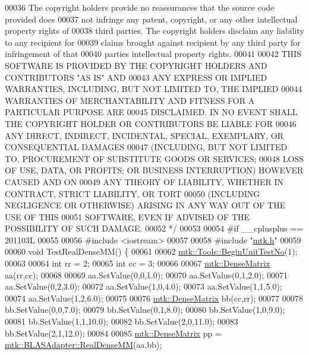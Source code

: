 \begin{DoxyCode}
00036 \textcolor{comment}{The copyright holders provide no reassurances that the source code provided does}
00037 \textcolor{comment}{not infringe any patent, copyright, or any other intellectual property rights of}
00038 \textcolor{comment}{third parties. The copyright holders disclaim any liability to any recipient for}
00039 \textcolor{comment}{claims brought against recipient by any third party for infringement of that}
00040 \textcolor{comment}{parties intellectual property rights.}
00041 \textcolor{comment}{}
00042 \textcolor{comment}{THIS SOFTWARE IS PROVIDED BY THE COPYRIGHT HOLDERS AND CONTRIBUTORS "AS IS" AND}
00043 \textcolor{comment}{ANY EXPRESS OR IMPLIED WARRANTIES, INCLUDING, BUT NOT LIMITED TO, THE IMPLIED}
00044 \textcolor{comment}{WARRANTIES OF MERCHANTABILITY AND FITNESS FOR A PARTICULAR PURPOSE ARE}
00045 \textcolor{comment}{DISCLAIMED. IN NO EVENT SHALL THE COPYRIGHT HOLDER OR CONTRIBUTORS BE LIABLE FOR}
00046 \textcolor{comment}{ANY DIRECT, INDIRECT, INCIDENTAL, SPECIAL, EXEMPLARY, OR CONSEQUENTIAL DAMAGES}
00047 \textcolor{comment}{(INCLUDING, BUT NOT LIMITED TO, PROCUREMENT OF SUBSTITUTE GOODS OR SERVICES;}
00048 \textcolor{comment}{LOSS OF USE, DATA, OR PROFITS; OR BUSINESS INTERRUPTION) HOWEVER CAUSED AND ON}
00049 \textcolor{comment}{ANY THEORY OF LIABILITY, WHETHER IN CONTRACT, STRICT LIABILITY, OR TORT}
00050 \textcolor{comment}{(INCLUDING NEGLIGENCE OR OTHERWISE) ARISING IN ANY WAY OUT OF THE USE OF THIS}
00051 \textcolor{comment}{SOFTWARE, EVEN IF ADVISED OF THE POSSIBILITY OF SUCH DAMAGE.}
00052 \textcolor{comment}{*/}
00053 
00054 \textcolor{preprocessor}{#if \_\_cplusplus == 201103L}
00055 
00056 \textcolor{preprocessor}{#include <iostream>}
00057 
00058 \textcolor{preprocessor}{#include "\hyperlink{mtk_8h}{mtk.h}"}
00059 
00060 \textcolor{keywordtype}{void} TestRealDenseMM() \{
00061 
00062   \hyperlink{classmtk_1_1Tools_a26ee906d28523378522a75e25c3a4e19}{mtk::Tools::BeginUnitTestNo}(1);
00063 
00064   \textcolor{keywordtype}{int} rr = 2;
00065   \textcolor{keywordtype}{int} cc = 3;
00066 
00067   \hyperlink{classmtk_1_1DenseMatrix}{mtk::DenseMatrix} aa(rr,cc);
00068 
00069   aa.SetValue(0,0,1.0);
00070   aa.SetValue(0,1,2.0);
00071   aa.SetValue(0,2,3.0);
00072   aa.SetValue(1,0,4.0);
00073   aa.SetValue(1,1,5.0);
00074   aa.SetValue(1,2,6.0);
00075 
00076   \hyperlink{classmtk_1_1DenseMatrix}{mtk::DenseMatrix} bb(cc,rr);
00077 
00078   bb.SetValue(0,0,7.0);
00079   bb.SetValue(0,1,8.0);
00080   bb.SetValue(1,0,9.0);
00081   bb.SetValue(1,1,10.0);
00082   bb.SetValue(2,0,11.0);
00083   bb.SetValue(2,1,12.0);
00084 
00085   \hyperlink{classmtk_1_1DenseMatrix}{mtk::DenseMatrix} pp = \hyperlink{classmtk_1_1BLASAdapter_acebd0e9bfe0bdd609c7fbea98ccfd3b5}{mtk::BLASAdapter::RealDenseMM}(aa,bb);

\end{DoxyCode}
